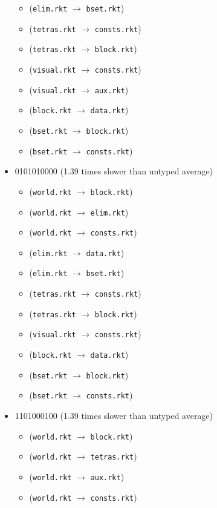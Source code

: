 \documentclass{article}
\newcommand{\mono}[1]{\texttt{#1}}
\begin{document}
\begin{itemize}
\begin{itemize}
  \item (\mono{elim.rkt} $\rightarrow$ \mono{bset.rkt})
  \item (\mono{tetras.rkt} $\rightarrow$ \mono{consts.rkt})
  \item (\mono{tetras.rkt} $\rightarrow$ \mono{block.rkt})
  \item (\mono{visual.rkt} $\rightarrow$ \mono{consts.rkt})
  \item (\mono{visual.rkt} $\rightarrow$ \mono{aux.rkt})
  \item (\mono{block.rkt} $\rightarrow$ \mono{data.rkt})
  \item (\mono{bset.rkt} $\rightarrow$ \mono{block.rkt})
  \item (\mono{bset.rkt} $\rightarrow$ \mono{consts.rkt})
  \end{itemize}
\item 0101010000 (1.39 times slower than untyped average)
  \begin{itemize}
  \item (\mono{world.rkt} $\rightarrow$ \mono{block.rkt})
  \item (\mono{world.rkt} $\rightarrow$ \mono{elim.rkt})
  \item (\mono{world.rkt} $\rightarrow$ \mono{consts.rkt})
  \item (\mono{elim.rkt} $\rightarrow$ \mono{data.rkt})
  \item (\mono{elim.rkt} $\rightarrow$ \mono{bset.rkt})
  \item (\mono{tetras.rkt} $\rightarrow$ \mono{consts.rkt})
  \item (\mono{tetras.rkt} $\rightarrow$ \mono{block.rkt})
  \item (\mono{visual.rkt} $\rightarrow$ \mono{consts.rkt})
  \item (\mono{block.rkt} $\rightarrow$ \mono{data.rkt})
  \item (\mono{bset.rkt} $\rightarrow$ \mono{block.rkt})
  \item (\mono{bset.rkt} $\rightarrow$ \mono{consts.rkt})
  \end{itemize}
\item 1101000100 (1.39 times slower than untyped average)
  \begin{itemize}
  \item (\mono{world.rkt} $\rightarrow$ \mono{block.rkt})
  \item (\mono{world.rkt} $\rightarrow$ \mono{tetras.rkt})
  \item (\mono{world.rkt} $\rightarrow$ \mono{aux.rkt})
  \item (\mono{world.rkt} $\rightarrow$ \mono{consts.rkt})

\end{itemize}
\end{itemize}
\end{document}
